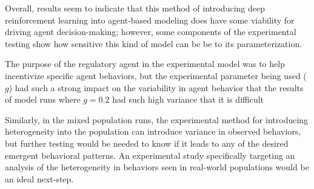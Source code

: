 Overall, results seem to indicate that this method of introducing
deep reinforcement learning into agent-based modeling does have some
viability for driving agent decision-making;
however,
some components of the experimental testing show how sensitive this
kind of model can be be to its parameterization.

The purpose of the regulatory agent in the experimental model was
to help incentivize specific agent behaviors, but the experimental
parameter being used ($g$) had such a strong impact on the variability
in agent behavior that the results of model runs where $g=0.2$
had such high variance that it is difficult 

Similarly,
in the mixed population runs, the experimental method for introducing
heterogeneity into the population can introduce variance in observed
behaviors, but further testing would be needed to know if it leads
to any of the desired emergent behavioral patterns.
An experimental study specifically targeting an analysis of
the heterogeneity in behaviors seen in real-world populations
would be an ideal next-step.
